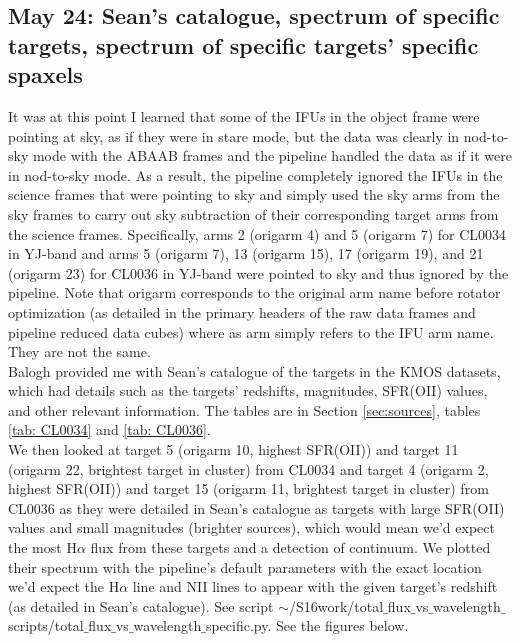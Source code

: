 \documentclass[10pt,letterpaper]{article}
\begin{document}
\subsection{May 24: Sean's catalogue, spectrum of specific targets, spectrum of specific targets' specific spaxels}
It was at this point I learned that some of the IFUs in the object frame were pointing at sky, as if they were in stare mode, but the data was clearly in nod-to-sky mode with the ABAAB frames and the pipeline handled the data as if it were in nod-to-sky mode. As a result, the pipeline completely ignored the IFUs in the science frames that were pointing to sky and simply used the sky arms from the sky frames to carry out sky subtraction of their corresponding target arms from the science frames. Specifically, arms 2 (origarm 4) and 5 (origarm 7) for CL0034 in YJ-band and arms 5 (origarm 7), 13 (origarm 15), 17 (origarm 19), and 21 (origarm 23) for CL0036 in YJ-band were pointed to sky and thus ignored by the pipeline. Note that origarm corresponds to the original arm name before rotator optimization (as detailed in the primary headers of the raw data frames and pipeline reduced data cubes) where as arm simply refers to the IFU arm name. They are not the same.\\

Balogh provided me with Sean's catalogue of the targets in the KMOS datasets, which had details such as the targets' redshifts, magnitudes, SFR(OII) values, and other relevant information. The tables are in Section \ref{sec:sources}, tables \ref{tab: CL0034} and \ref{tab: CL0036}.\\

We then looked at target 5 (origarm 10, highest SFR(OII)) and target 11 (origarm 22, brightest target in cluster) from CL0034 and target 4 (origarm 2, highest SFR(OII)) and target 15 (origarm 11, brightest target in cluster) from CL0036 as they were detailed in Sean's catalogue as targets with large SFR(OII) values and small magnitudes (brighter sources), which would mean we'd expect the most H$\alpha$ flux from these targets and a detection of continuum. We plotted their spectrum with the pipeline's default parameters with the exact location we'd expect the H$\alpha$ line and NII lines to appear with the given target's redshift (as detailed in Sean's catalogue). See script $\sim$/S16work/total$\_$flux$\_$vs$\_$wavelength$\_$scripts/total$\_$flux$\_$vs$\_$wavelength$\_$specific.py. See the figures below.\\
\end{document}
